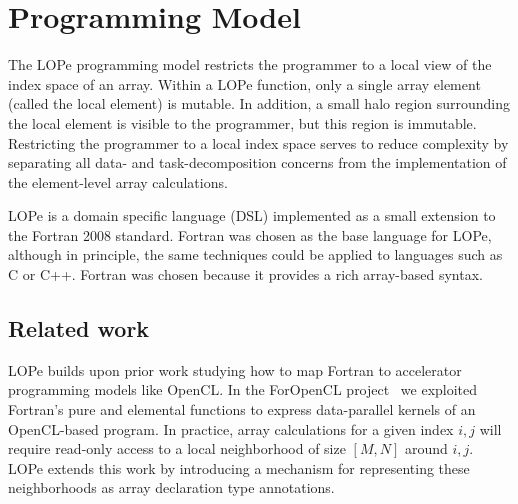 \section{Programming Model}

The LOPe programming model
restricts the programmer to a local view of the index
space of an array.  Within a LOPe function, only a single array
element (called the local element) is mutable.  In addition, a small
halo region surrounding the local element is visible to the
programmer, but this region is immutable.  Restricting the programmer
to a local index space serves to reduce complexity by separating all
data- and task-decomposition concerns from the implementation of the
element-level array calculations.


LOPe is a domain specific language (DSL) implemented as a small extension
to the Fortran 2008 standard.
Fortran was chosen as the base language for LOPe, although in
principle, the same techniques could be applied to languages such as C
or C++.  Fortran was chosen because it provides a
rich array-based syntax.


\subsection{Related work}

LOPe builds upon prior work studying how to map Fortran to accelerator
programming models like OpenCL.  In the ForOpenCL project~\cite{Sottile:2013:FTE:2441516.2441520}
we exploited Fortran's pure and elemental functions to express
data-parallel kernels of an OpenCL-based program.  In practice, array
calculations for a given index $i,j$ will require read-only access to
a local neighborhood of size $[M,N]$ around $i,j$.  LOPe extends this work by introducing
a mechanism for representing these neighborhoods as array declaration
type annotations.

